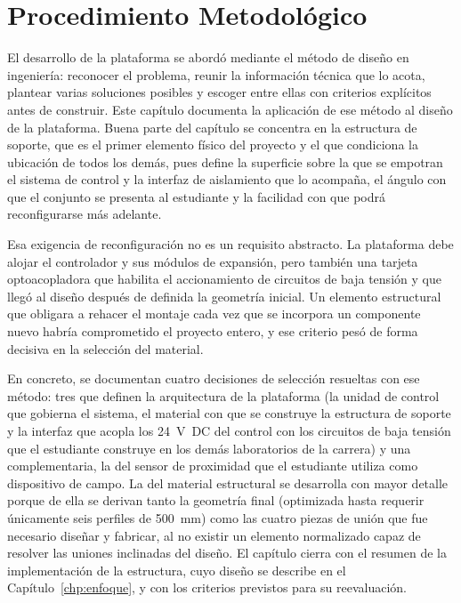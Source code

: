 \documentclass[12pt,a4paper,oneside]{report}
\begin{document}
\chapter{Procedimiento Metodológico}
\label{chp:procedimientos}

El desarrollo de la plataforma se abordó mediante el método de diseño en ingeniería: reconocer el problema, reunir la información técnica que lo acota, plantear varias soluciones posibles y escoger entre ellas con criterios explícitos antes de construir. Este capítulo documenta la aplicación de ese método al diseño de la plataforma. Buena parte del capítulo se concentra en la estructura de soporte, que es el primer elemento físico del proyecto y el que condiciona la ubicación de todos los demás, pues define la superficie sobre la que se empotran el sistema de control y la interfaz de aislamiento que lo acompaña, el ángulo con que el conjunto se presenta al estudiante y la facilidad con que podrá reconfigurarse más adelante.

Esa exigencia de reconfiguración no es un requisito abstracto. La plataforma debe alojar el controlador y sus módulos de expansión, pero también una tarjeta optoacopladora que habilita el accionamiento de circuitos de baja tensión y que llegó al diseño después de definida la geometría inicial. Un elemento estructural que obligara a rehacer el montaje cada vez que se incorpora un componente nuevo habría comprometido el proyecto entero, y ese criterio pesó de forma decisiva en la selección del material.

En concreto, se documentan cuatro decisiones de selección resueltas con ese método: tres que definen la arquitectura de la plataforma (la unidad de control que gobierna el sistema, el material con que se construye la estructura de soporte y la interfaz que acopla los 24~V~DC del control con los circuitos de baja tensión que el estudiante construye en los demás laboratorios de la carrera) y una complementaria, la del sensor de proximidad que el estudiante utiliza como dispositivo de campo. La del material estructural se desarrolla con mayor detalle porque de ella se derivan tanto la geometría final (optimizada hasta requerir únicamente seis perfiles de 500~mm) como las cuatro piezas de unión que fue necesario diseñar y fabricar, al no existir un elemento normalizado capaz de resolver las uniones inclinadas del diseño. El capítulo cierra con el resumen de la implementación de la estructura, cuyo diseño se describe en el Capítulo~\ref{chp:enfoque}, y con los criterios previstos para su reevaluación.
\end{document}
